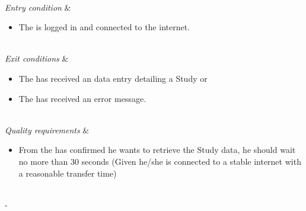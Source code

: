 \begin{table}[H]
\begin{tabu}
\begin{enumerate}[leftmargin=*,topsep=0pt,itemsep=-1ex]
	\end{enumerate} \\
	\hline
	\textit{Entry condition} &
	\vspace{-3mm}
	\begin{itemize}[leftmargin=*,topsep=0pt,itemsep=-1ex]
		\item The \client is logged in and connected to the internet.
	\end{itemize} \\
	\hline
	\textit{Exit conditions} &
	\vspace{-3mm}
	\begin{itemize}[leftmargin=*,topsep=0pt,itemsep=-1ex]
		\item The \client has received an data entry detailing a Study or
		\item The \client has received an error message.
	\end{itemize} \\
	\hline
	\textit{Quality \newline requirements} &
	\vspace{-3mm}
	\begin{itemize}[leftmargin=*,topsep=0pt,itemsep=-1ex]
		\item From the \client has confirmed he wants to retrieve the Study data,  he should wait no more than 30 seconds (Given he/she is connected to a stable internet with a reasonable transfer time)
	\end{itemize} \\
	\tabucline[1.5pt]-
\end{tabu}
\caption{Use case: RetrieveStudyInformation}
\label{uc:RetrieveStudyInformation}
\end{table}